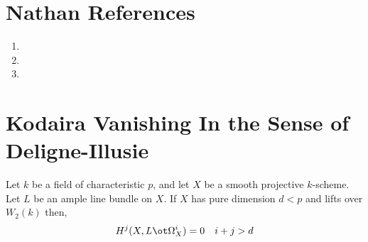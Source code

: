 \documentclass[12pt]{article}
\begin{document}
\section{Nathan References}

\begin{enumerate}
\item {}

\item {}

\item {}
\end{enumerate}




\section{Kodaira Vanishing In the Sense of Deligne-Illusie}

\begin{theorem}
Let $k$ be a field of characteristic $p$, and let $X$ be a smooth projective $k$-scheme. Let $L$ be an ample line bundle on $X$. If $X$ has pure dimension $d < p$ and lifts over $W_2(k)$ then,
\[ H^j(X, L \ot \Omega_X^i) = 0 \quad i + j > d \]
\end{theorem}
\end{document}
